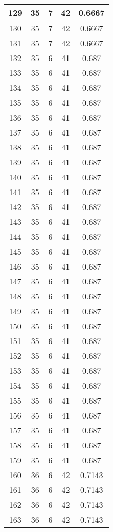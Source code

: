 \documentclass[letterpaper, 12pt]{article}
\begin{document}
\begin{longtable}{|c|c|c|c|c|}
\hline
129 & 35 & 7 & 42 & 0.6667 \\
\hline
130 & 35 & 7 & 42 & 0.6667 \\
\hline
131 & 35 & 7 & 42 & 0.6667 \\
\hline
132 & 35 & 6 & 41 & 0.687 \\
\hline
133 & 35 & 6 & 41 & 0.687 \\
\hline
134 & 35 & 6 & 41 & 0.687 \\
\hline
135 & 35 & 6 & 41 & 0.687 \\
\hline
136 & 35 & 6 & 41 & 0.687 \\
\hline
137 & 35 & 6 & 41 & 0.687 \\
\hline
138 & 35 & 6 & 41 & 0.687 \\
\hline
139 & 35 & 6 & 41 & 0.687 \\
\hline
140 & 35 & 6 & 41 & 0.687 \\
\hline
141 & 35 & 6 & 41 & 0.687 \\
\hline
142 & 35 & 6 & 41 & 0.687 \\
\hline
143 & 35 & 6 & 41 & 0.687 \\
\hline
144 & 35 & 6 & 41 & 0.687 \\
\hline
145 & 35 & 6 & 41 & 0.687 \\
\hline
146 & 35 & 6 & 41 & 0.687 \\
\hline
147 & 35 & 6 & 41 & 0.687 \\
\hline
148 & 35 & 6 & 41 & 0.687 \\
\hline
149 & 35 & 6 & 41 & 0.687 \\
\hline
150 & 35 & 6 & 41 & 0.687 \\
\hline
151 & 35 & 6 & 41 & 0.687 \\
\hline
152 & 35 & 6 & 41 & 0.687 \\
\hline
153 & 35 & 6 & 41 & 0.687 \\
\hline
154 & 35 & 6 & 41 & 0.687 \\
\hline
155 & 35 & 6 & 41 & 0.687 \\
\hline
156 & 35 & 6 & 41 & 0.687 \\
\hline
157 & 35 & 6 & 41 & 0.687 \\
\hline
158 & 35 & 6 & 41 & 0.687 \\
\hline
159 & 35 & 6 & 41 & 0.687 \\
\hline
160 & 36 & 6 & 42 & 0.7143 \\
\hline
161 & 36 & 6 & 42 & 0.7143 \\
\hline
162 & 36 & 6 & 42 & 0.7143 \\
\hline
163 & 36 & 6 & 42 & 0.7143 \\

\end{longtable}
\end{document}
